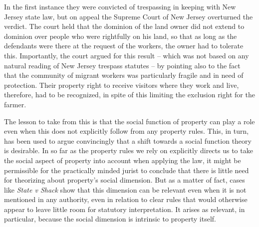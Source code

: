 In the first instance they were convicted of trespassing in keeping with New Jersey state law, but on appeal the Supreme Court of New Jersey overturned the verdict. The court held that the dominion of the land owner did not extend to dominion over people who were rightfully on his land, so that as long as the defendants were there at the request of the workers, the owner had to tolerate this. Importantly, the court argued for this result -- which was not based on any natural reading of New Jersey trespass statutes -- by pointing also to the fact that the community of migrant workers was particularly fragile and in need of protection. Their property right to receive visitors where they work and live, therefore, had to be recognized, in spite of this limiting the exclusion right for the farmer. 

The lesson to take from this is that the social function of property can play a role even when this does not explicitly follow from any property rules. This, in turn, has been used to argue convincingly that a shift towards a social function theory is desirable. In so far as the property rules we rely on explicitly directs us to take the social aspect of property into account when applying the law, it might be permissible for the practically minded jurist to conclude that there is little need for theorizing about property's social dimension. But as a matter of fact, cases like {\it State v Shack} show that this dimension can be relevant even when it is not mentioned in any authority, even in relation to clear rules that would otherwise appear to leave little room for statutory interpretation. It arises as relevant, in particular, because the social dimension is intrinsic to property itself. 

